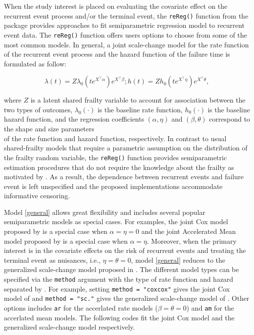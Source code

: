 When the study interest is placed on evaluating the covariate effect on
the recurrent event process and/or the terminal event, the
\texttt{reReg()} function from the  package provides
approaches to fit semiparametric regression model to recurrent event
data. The \texttt{reReg()} function offers users options to choose from
some of the most common models. In general, a joint scale-change model
for the rate function of the recurrent event process and the hazard
function of the failure time is formulated as follow:

\begin{equation}
\lambda(t) = Z \lambda_0(te^{X^\top\alpha})e^{X^\top\beta};
h(t) = Z h_0(te^{X^\top\eta})e^{X^\top\theta},
\label{general}
\end{equation}

where \(Z\) is a latent shared frailty variable to account for
association between the two types of outcomes, \(\lambda_0(\cdot)\) is
the baseline rate function, \(h_0(\cdot)\) is the baseline hazard
function, and the regression coefficients \((\alpha, \eta)\) and
\((\beta, \theta)\) correspond to the shape and size parameters\\
of the rate function and hazard function, respectively. In contrast to
usual shared-frailty models that require a parametric assumption on the
distribution of the frailty random variable, the \texttt{reReg()}
function provides semiparametric estimation procedures that do not
require the knowledge about the frailty as motivated by
\citet{wang2001analyzing}. As a result, the dependence between recurrent
events and failure event is left unspecified and the proposed
implementations accommodate informative censoring.

Model \ref{general} allows great flexibility and includes several
popular semiparametric models as special cases. For examples, the joint
Cox model proposed by \citet{huang2004joint} is a special case when
\(\alpha = \eta = 0\) and the joint Accelerated Mean model proposed by
\citet{xu2017joint} is a special case when \(\alpha = \eta\). Moreover,
when the primary interest is in the covariate effects on the risk of
recurrent events and treating the terminal event as nuisances, i.e.,
\(\eta = \theta = 0\), model \ref{general} reduces to the generalized
scale-change model proposed in \citet{xu2019generalized}. The different
model types can be specified via the \texttt{method} argument with the
type of rate function and hazard separated by \texttt{\textbar{}}. For
example, setting \texttt{method\ =\ "cox\textbar{}cox"} gives the joint
Cox model of \citet{huang2004joint} and
\texttt{method\ =\ "sc\textbar{}."} gives the generalized scale-change
model of \citet{xu2019generalized}. Other options includes \texttt{ar}
for the accerlated rate models (\(\beta = \theta = 0\)) and \texttt{am}
for the accerlated mean models. The following codes fit the joint Cox
model and the generalized scale-change model respectively.

